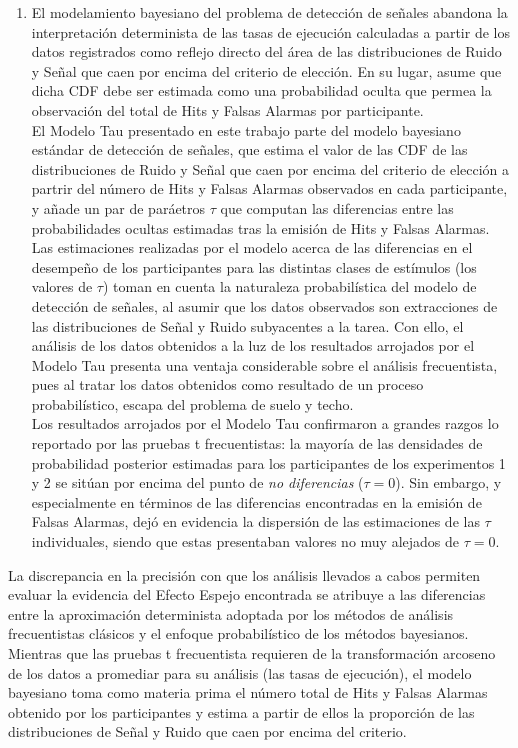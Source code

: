\documentclass[jou,apacite]{apa6}
\begin{document}
\begin{enumerate}
\item El modelamiento bayesiano del problema de detección de señales abandona la interpretación determinista de las tasas de ejecución calculadas a partir de los datos registrados como reflejo directo del área de las distribuciones de Ruido y Señal que caen por encima del criterio de elección. En su lugar, asume que dicha CDF debe ser estimada como una probabilidad oculta que permea la observación del total de Hits y Falsas Alarmas por participante.\\

El Modelo Tau presentado en este trabajo parte del modelo bayesiano estándar de detección de señales, que estima el valor de las CDF de las distribuciones de Ruido y Señal que caen por encima del criterio de elección a partrir del número de Hits y Falsas Alarmas observados en cada participante, y añade un par de paráetros $\tau$ que computan las diferencias entre las probabilidades ocultas estimadas tras la emisión de Hits y Falsas Alarmas. Las estimaciones realizadas por el modelo acerca de las diferencias en el desempeño de los participantes para las distintas clases de estímulos (los valores de $\tau$) toman en cuenta la naturaleza probabilística del modelo de detección de señales, al asumir que los datos observados son extracciones de las distribuciones de Señal y Ruido subyacentes a la tarea. Con ello, el análisis de los datos obtenidos a la luz de los resultados arrojados por el Modelo Tau presenta una ventaja considerable sobre el análisis frecuentista, pues al tratar los datos obtenidos como resultado de un proceso probabilístico, escapa del problema de suelo y techo.\\

Los resultados arrojados por el Modelo Tau confirmaron a grandes razgos lo reportado por las pruebas t frecuentistas: la mayoría de las densidades de probabilidad posterior estimadas para los participantes de los experimentos 1 y 2 se sitúan por encima del punto de \textit{no diferencias} ($\tau = 0$). Sin embargo, y especialmente en términos de las diferencias encontradas en la emisión de Falsas Alarmas, dejó en evidencia la dispersión de las estimaciones de las $\tau$ individuales, siendo que estas presentaban valores no muy alejados de $\tau = 0$.\\
\end{enumerate}

La discrepancia en la precisión con que los análisis llevados a cabos permiten evaluar la evidencia del Efecto Espejo encontrada se atribuye a las diferencias entre la aproximación determinista adoptada por los métodos de análisis frecuentistas clásicos y el enfoque probabilístico de los métodos bayesianos. Mientras que las pruebas t frecuentista requieren de la transformación arcoseno de los datos a promediar para su análisis (las tasas de ejecución), el modelo bayesiano toma como materia prima el número total de Hits y Falsas Alarmas obtenido por los participantes y estima a partir de ellos la proporción de las distribuciones de Señal y Ruido que caen por encima del criterio. \\
\end{document}
